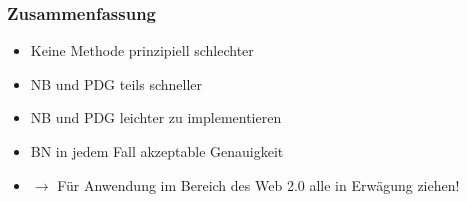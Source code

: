 \documentclass{beamer}
\begin{document}
\begin{frame}
  \frametitle{Zusammenfassung}
  \begin{itemize}
    \item Keine Methode prinzipiell schlechter
    \item NB und PDG teils schneller
    \item NB und PDG leichter zu implementieren
    \item BN in jedem Fall akzeptable Genauigkeit
    \item $\rightarrow$ Für Anwendung im Bereich des Web 2.0 alle in Erwägung ziehen!
  \end{itemize}
\end{frame}
\end{document}
